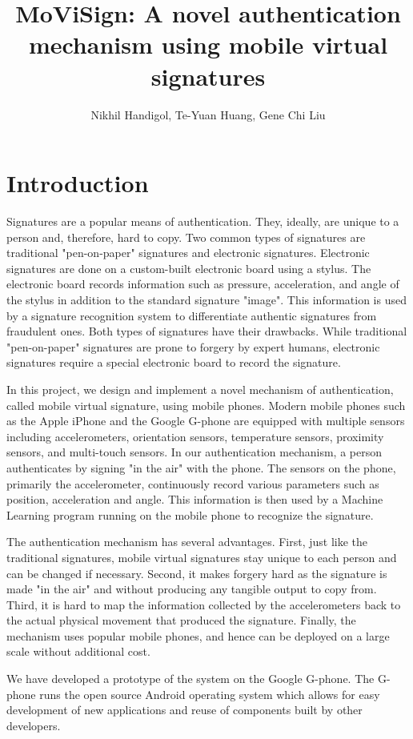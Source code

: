 \documentclass[12pt]{article}
\title{MoViSign: A novel authentication mechanism using mobile virtual signatures}
\author{Nikhil Handigol, Te-Yuan Huang, Gene Chi Liu}
\date{}
\begin{document}
\maketitle


\section{Introduction}

Signatures are a popular means of authentication. They, ideally, are unique to a person and, therefore, hard to copy. Two common types of signatures are traditional "pen-on-paper" signatures and electronic signatures. Electronic signatures are done on a custom-built electronic board using a stylus. The electronic board records information such as pressure, acceleration, and angle of the stylus in addition to the standard signature "image". This information is used by a signature recognition system to differentiate authentic signatures from fraudulent ones. Both types of signatures have their drawbacks. While traditional "pen-on-paper" signatures are prone to forgery by expert humans, electronic signatures require a special electronic board to record the signature.

In this project, we design and implement a novel mechanism of authentication, called mobile virtual signature, using mobile phones. Modern mobile phones such as the Apple iPhone and the Google G-phone are equipped with multiple sensors including accelerometers, orientation sensors, temperature sensors, proximity sensors, and multi-touch sensors. In our authentication mechanism, a person authenticates by signing "in the air" with the phone. The sensors on the phone, primarily the accelerometer, continuously record various parameters such as position, acceleration and angle. This information is then used by a Machine Learning program running on the mobile phone to recognize the signature.

The authentication mechanism has several advantages. First, just like the traditional signatures, mobile virtual signatures stay unique to each person and can be changed if necessary. Second, it makes forgery hard as the signature is made "in the air" and without producing any tangible output to copy from. Third, it is hard to map the information collected by the accelerometers back to the actual physical movement that produced the signature. Finally, the mechanism uses popular mobile phones, and hence can be deployed on a large scale without additional cost.

We have developed a prototype of the system on the Google G-phone. The G-phone runs the open source Android operating system which allows for easy development of new applications and reuse of components built by other developers.
\end{document}

